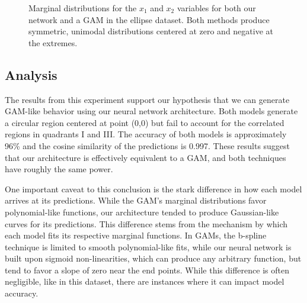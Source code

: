 \begin{figure}
\centering
\begin{subfigure}{.5\textwidth}
  \centering
  
\end{subfigure}%
\begin{subfigure}{.5\textwidth}
  \centering
  
\end{subfigure}
\caption{Marginal distributions for the $x_1$ and $x_2$ variables for both our network and a GAM in the ellipse dataset. Both methods produce symmetric, unimodal distributions centered at zero and negative at the extremes.}
\label{fig:ellipse_marginals}
\end{figure}


\subsection{Analysis}

The results from this experiment support our hypothesis that we can generate GAM-like behavior using our neural network architecture. Both models generate a circular region centered at point (0,0) but fail to account for the correlated regions in quadrants I and III. The accuracy of both models is approximately 96\% and the cosine similarity of the predictions is 0.997. These results suggest that our architecture is effectively equivalent to a GAM, and both techniques have roughly the same power. 

One important caveat to this conclusion is the stark difference in how each model arrives at its predictions. While the GAM's marginal distributions favor polynomial-like functions, our architecture tended to produce Gaussian-like curves for its predictions. This difference stems from the mechanism by which each model fits its respective marginal functions. In GAMs, the b-spline technique is limited to smooth polynomial-like fits, while our neural network is built upon sigmoid non-linearities, which can produce any arbitrary function, but tend to favor a slope of zero near the end points. While this difference is often negligible, like in this dataset, there are instances where it can impact model accuracy. 